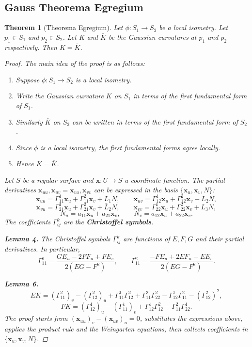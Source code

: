 \documentclass[10pt, a4paper]{article}
\theoremstyle{plain}
\newtheorem{theorem}{Theorem}[section]
\theoremstyle{definition}
\theoremstyle{remark}
\begin{document}
\pagebreak
\subsection{Gauss Theorema Egregium}

\begin{theorem}[Theorema Egregium]
  Let $\phi: S_1 \to S_2$ be a local isometry. Let $p_1 \in S_1$ and $p_2 \in S_2$. Let
  $K$ and $\bar{K}$ be the Gaussian curvatures at $p_1$ and $p_2$ respectively. Then
  $K = \bar{K}$.

  \begin{proof}
The main idea of the proof is as follows:
\begin{enumerate}
  \item Suppose $\phi: S_1 \to S_2$ is a local isometry.
  \item Write the Gaussian curvature $K$ on $S_1$ in terms of the first fundamental form of $S_1$.
  \item Similarly $\overline{K}$ on $S_2$ can be written in terms of the first fundamental form of $S_2$.
  \item Since $\phi$ is a local isometry, the first fundamental forms agree locally.
  \item Hence $K = \overline{K}$.
\end{enumerate}



Let $S$ be a regular surface and $\mathbf{x}: U \to S$ a coordinate function. The partial
derivatives $\mathbf{x}_{uu}, \mathbf{x}_{uv} = \mathbf{x}_{vu}, \mathbf{x}_{vv}$ can be
expressed in the basis $\{\mathbf{x}_u, \mathbf{x}_v, N\}$:
\[
  \mathbf{x}_{uu} = \Gamma_{11}^1\mathbf{x}_u + \Gamma_{11}^2\mathbf{x}_v + L_1 N, \qquad
  \mathbf{x}_{uv} = \Gamma_{12}^1\mathbf{x}_u + \Gamma_{12}^2\mathbf{x}_v + L_2 N,
\]
\[
  \mathbf{x}_{vu} = \Gamma_{21}^1\mathbf{x}_u + \Gamma_{21}^2\mathbf{x}_v + \bar{L}_2 N, \qquad
  \mathbf{x}_{vv} = \Gamma_{22}^1\mathbf{x}_u + \Gamma_{22}^2\mathbf{x}_v + L_3 N,
\]
\[
  N_u = a_{11}\mathbf{x}_u + a_{21}\mathbf{x}_v, \qquad
  N_v = a_{12}\mathbf{x}_u + a_{22}\mathbf{x}_v.
\]
The coefficients $\Gamma_{ij}^k$ are the \textbf{Christoffel symbols}.

\textbf{Lemma 4.} The Christoffel symbols $\Gamma_{ij}^k$ are functions of $E, F, G$ and
their partial derivatives. In particular,
\[
  \Gamma_{11}^1 = \frac{GE_u - 2FF_u + FE_v}{2(EG - F^2)}, \qquad
  \Gamma_{11}^2 = \frac{-FE_u + 2EF_u - EE_v}{2(EG - F^2)}.
\]

\textbf{Lemma 6.}
\[
  EK = (\Gamma_{11}^2)_v - (\Gamma_{12}^2)_u
     + \Gamma_{11}^1\Gamma_{12}^2 + \Gamma_{11}^2\Gamma_{22}^2
     - \Gamma_{12}^1\Gamma_{11}^2 - (\Gamma_{12}^2)^2,
\]
\[
  FK = (\Gamma_{12}^1)_u - (\Gamma_{11}^1)_v
     + \Gamma_{12}^1\Gamma_{12}^2 - \Gamma_{11}^2\Gamma_{22}^1.
\]
The proof starts from $(\mathbf{x}_{uu})_v - (\mathbf{x}_{uv})_u = 0$, substitutes the
expressions above, applies the product rule and the Weingarten equations, then collects
coefficients in $\{\mathbf{x}_u, \mathbf{x}_v, N\}$.


\end{proof}
\end{theorem}
\end{document}
